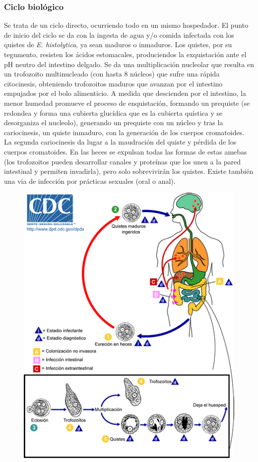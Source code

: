 \subsubsection{Ciclo biológico}
\begin{multicols}{2}
	Se trata de un ciclo directo, ocurriendo todo en un mismo hospedador. El punto de inicio del ciclo se da con la ingesta de agua y/o comida infectada con los quistes de \textit{E. histolytica}, ya sean maduros o inmaduros. Los quistes, por su tegumento, resisten los ácidos estomacales, produciendos la exquistación ante el pH neutro del intestino delgado. Se da una multiplicación nucleolar que resulta en un trofozoito multinucleado (con hasta 8 núcleos) que sufre una rápida citocinesis, obteniendo trofozoitos maduros que avanzan por el intestino empujados por el bolo alimenticio. A medida que descienden por el intestino, la menor humedad promueve el proceso de enquistación, formando un prequiste (se redondea y forma una cubierta glucídica que es la cubierta quística y se desorganiza el nucleolo), generando un prequiste con un núcleo y tras la cariocinesis, un quiste inmaduro, con la generación de los cuerpos cromatoides. La segunda cariocinesis da lugar a la maudración del quiste y pérdida de los cuerpos cromatoides. En las heces se expulsan todas las formas de estas amebas (los trofozoitos pueden desarrollar canales y proteínas que los unen a la pared intestinal y permiten invadirla), pero solo sobrevivirán los quistes. Existe también una via de infección por prácticas sexuales (oral o anal).
	\columnbreak
	\begin{figure}[H]
		\centering
		\includegraphics[width=\columnwidth]{A.imagenes/ACV-BioSan-Parasit-EHistolyticaCbios}

\end{figure}
\end{multicols}
